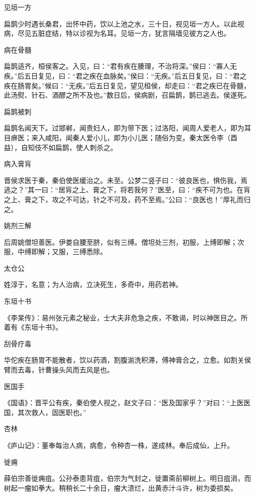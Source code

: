 \documentclass[a4paper,12pt,UTF8,twoside]{ctexbook}
\begin{document}
    见垣一方
    
    扁鹊少时遇长桑君，出怀中药，饮以上池之水，三十日，视见垣一方人。以此视病，尽见五脏症结，特以诊视为名耳。见垣一方，犹言隔墙见彼方之人也。
    
    病在骨髓
    
    扁鹊适齐，桓侯客之。入见，曰：“君有疾在腠理，不治将深。”侯曰：“寡人无疾。”后五日复见，曰：“君之疾在血脉矣。”侯曰：“无疾。”后五日复见，曰：“君之疾在肠胃矣。”候曰：“无疾。”后五日复见，望见桓侯，却走曰：“君之疾已在骨髓，此汤熨、针石、酒醪之所不及也。”数日后，侯病剧，召扁鹊，鹊已逃去。侯遂死。
    
    扁鹊被刺
    
    扁鹊名闻天下。过邯郸，闻贵妇人，即为带下医；过洛阳，闻周人爱老人，即为耳目痹医；来入咸阳，闻秦人爱小儿，即为小儿医；随俗为变。秦太医令李（酉益），自知伎不如扁鹊，使人刺杀之。
    
    病入膏肓
    
    晋侯求医于秦，秦伯使医缓治之。未至。公梦二竖子曰：“彼良医也，惧伤我，焉逃之？”其一曰：“居肓之上、膏之下，将若我何？”医至，曰：“疾不可为也。在肓之上、膏之下，攻之不可达，针之不可及，药不至焉。”公曰：“良医也！”厚礼而归之。
    
    姚剂三解
    
    后周姚僧坦善医。伊娄自腰至脐，似有三缚。僧坦处三剂，初服，上缚即解；次服，中缚即解；又服，三缚悉除。
    
    太仓公
    
    姓淳于，名意；为人治病，立决死生，多奇中，用药若神。
    
    东垣十书
    
    《李杲传》：易州张元素之秘业，士大夫非危急之疾，不敢谒，时以神医目之。所着有《东垣十书》。
    
    刮骨疗毒
    
    华佗疾在肠胃不能散者，饮以药酒，割腹湔洗积滞，傅神膏合之，立愈。如割关侯臂而去毒，针曹操头风而去风是也。
    
    医国手
    
    《国语》：晋平公有疾，秦伯使人视之，赵文子曰：“医及国家乎？”对曰：“上医医国，其次救人，固医职也。”
    
    杏林
    
    《庐山记》：董奉每治人病，病愈，令种杏一株，遂成林。奉后成仙，上升。
    
    徙痈
    
    薛伯宗善徙痈疽。公孙泰患背疽，伯宗为气封之，徙置斋前柳树上。明日疽消，而树起一瘤如拳大。稍稍长二十余日，瘤大溃烂，出黄赤汁斗许，树为委损矣。
    
\end{document}

